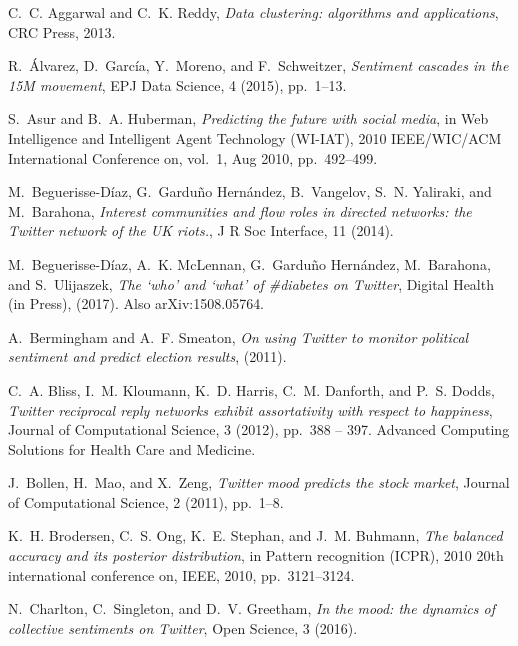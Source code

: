 \documentclass{article}
\begin{document}
\begin{thebibliography}{10}

{\sc C.~C. Aggarwal and C.~K. Reddy}, {\em Data clustering: algorithms and
  applications}, CRC Press, 2013.

{\sc R.~\'Alvarez, D.~Garc\'ia, Y.~Moreno, and F.~Schweitzer}, {\em Sentiment
  cascades in the {15M} movement}, EPJ Data Science, 4 (2015), pp.~1--13.

{\sc S.~Asur and B.~A. Huberman}, {\em Predicting the future with social
  media}, in Web Intelligence and Intelligent Agent Technology (WI-IAT), 2010
  IEEE/WIC/ACM International Conference on, vol.~1, Aug 2010, pp.~492--499.

{\sc M.~Beguerisse-D\'{i}az, G.~Gardu\~no Hern\'{a}ndez, B.~Vangelov, S.~N.
  Yaliraki, and M.~Barahona}, {\em {I}nterest communities and flow roles in
  directed networks: the {T}witter network of the {UK} riots.}, J R Soc
  Interface, 11 (2014).

{\sc M.~Beguerisse-D\'iaz, A.~K. McLennan, G.~Gardu\~no Hern\'{a}ndez,
  M.~Barahona, and S.~Ulijaszek}, {\em {T}he `who' and `what' of \#diabetes on
  {T}witter}, Digital Health (in Press),  (2017).
\newblock Also arXiv:1508.05764.

{\sc A.~Bermingham and A.~F. Smeaton}, {\em On using {T}witter to monitor
  political sentiment and predict election results},  (2011).

{\sc C.~A. Bliss, I.~M. Kloumann, K.~D. Harris, C.~M. Danforth, and P.~S.
  Dodds}, {\em Twitter reciprocal reply networks exhibit assortativity with
  respect to happiness}, Journal of Computational Science, 3 (2012), pp.~388 --
  397.
\newblock Advanced Computing Solutions for Health Care and Medicine.

{\sc J.~Bollen, H.~Mao, and X.~Zeng}, {\em Twitter mood predicts the stock
  market}, Journal of Computational Science, 2 (2011), pp.~1--8.

{\sc K.~H. Brodersen, C.~S. Ong, K.~E. Stephan, and J.~M. Buhmann}, {\em The
  balanced accuracy and its posterior distribution}, in Pattern recognition
  (ICPR), 2010 20th international conference on, IEEE, 2010, pp.~3121--3124.

{\sc N.~Charlton, C.~Singleton, and D.~V. Greetham}, {\em In the mood: the
  dynamics of collective sentiments on {T}witter}, Open Science, 3 (2016).


\end{thebibliography}
\end{document}
